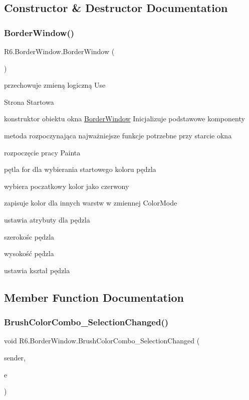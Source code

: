 \subsection{Constructor \& Destructor Documentation}
\mbox{\label{class_r6_1_1_border_window_a2fbd146cdcb26ba0d1797a2b60f36df4}} 
\subsubsection{\texorpdfstring{BorderWindow()}{BorderWindow()}}
{\footnotesize\ttfamily R6.\+Border\+Window.\+Border\+Window (\begin{DoxyParamCaption}{ }\end{DoxyParamCaption})}



przechowuje zmieną logiczną Use 

Strona Startowa 

konstruktor obiektu okna \mbox{\hyperlink{class_r6_1_1_border_window}{Border\+Window}} Inicjalizuje podstawowe komponenty 

metoda rozpoczynająca najważniejsze funkcje potrzebne przy starcie okna 

rozpoczęcie pracy Painta 

pętla for dla wybierania startowego koloru pędzla 

wybiera poczatkowy kolor jako czerwony 

zapisuje kolor dla innych warstw w zmiennej Color\+Mode 

ustawia atrybuty dla pędzla 

szerokośc pędzla 

wysokość pędzla 

ustawia kształ pędzla 

\subsection{Member Function Documentation}
\mbox{\label{class_r6_1_1_border_window_a5ba4a89ba8ece37221809d0729f106d7}} 
\subsubsection{\texorpdfstring{BrushColorCombo\_SelectionChanged()}{BrushColorCombo\_SelectionChanged()}}
{\footnotesize\ttfamily void R6.\+Border\+Window.\+Brush\+Color\+Combo\+\_\+\+Selection\+Changed (\begin{DoxyParamCaption}\item[{object}]{sender,  }\item[{Selection\+Changed\+Event\+Args}]{e }\end{DoxyParamCaption})\hspace{0.3cm}{\ttfamily [private]}}



